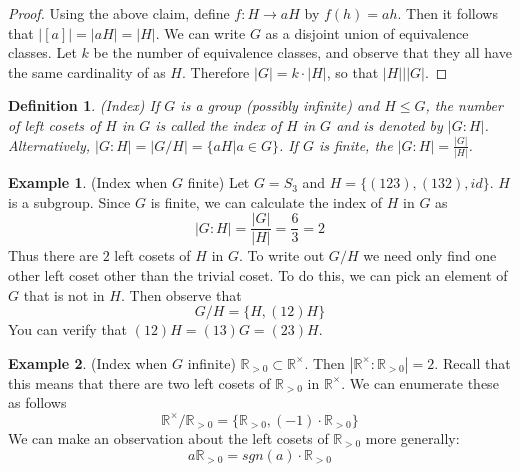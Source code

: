 \documentclass[12pt]{article}
\newtheorem{definition}{Definition}
\theoremstyle{definition}
\newtheorem{example}{Example}
\theoremstyle{definition}
\begin{document}
\begin{proof}
Using the above claim, define $f : H \to aH$ by $f(h) = ah$. Then it follows that $|[a] | = |aH| = |H|$. We can write $G$ as a disjoint union of equivalence classes. Let $k$ be the number of equivalence classes, and observe that they all have the same cardinality of as $H$. Therefore $|G| = k \cdot |H|$, so that $|H| \big\vert |G|$.
\end{proof}

\begin{definition}(Index)
If $G$ is a group (possibly infinite) and $H \leq G$, the number of left cosets of $H$ in $G$ is called the index of $H$ in $G$ and is denoted by $|G : H|$. Alternatively, $|G : H| = | G / H | = \{aH | a \in G\}$. If $G$ is finite, the $|G:H| = \frac{|G|}{|H|}$.
\end{definition}

\begin{example}(Index when $G$ finite)
Let $G = S_3$ and $H = \{ (1 2 3), (1 3 2), id \}$. $H$ is a subgroup. Since $G$ is finite, we can calculate the index of $H$ in $G$ as
\begin{equation}
	|G : H| = \frac{|G|}{|H|} = \frac{6}{3} = 2
\end{equation}
Thus there are $2$ left cosets of $H$ in $G$. To write out $G/H$ we need only find one other left coset other than the trivial coset. To do this, we can pick an element of $G$ that is not in $H$. Then observe that 
\begin{equation}
	G/H = \{H, (1 2) H \}
\end{equation}
You can verify that $(1 2) H = (1 3) G = (2 3) H$.
\end{example}

\begin{example}(Index when $G$ infinite)
$\mathbb{R}_{>0} \subset \mathbb{R}^{\times}$. Then $|\mathbb{R}^{\times} : \mathbb{R}_{> 0}| = 2$. Recall that this means that there are two left cosets of $\mathbb{R}_{>0}$ in $\mathbb{R}^{\times}$. We can enumerate these as follows
\begin{equation}
	\mathbb{R}^{\times} / \mathbb{R}_{> 0} = \{\mathbb{R}_{> 0}, (-1) \cdot \mathbb{R}_{> 0}\}
\end{equation}
We can make an observation about the left cosets of $\mathbb{R}_{> 0}$ more generally:
\begin{equation}
	a \mathbb{R}_{> 0} = sgn(a) \cdot \mathbb{R}_{> 0}
\end{equation}
\end{example}
\end{document}

